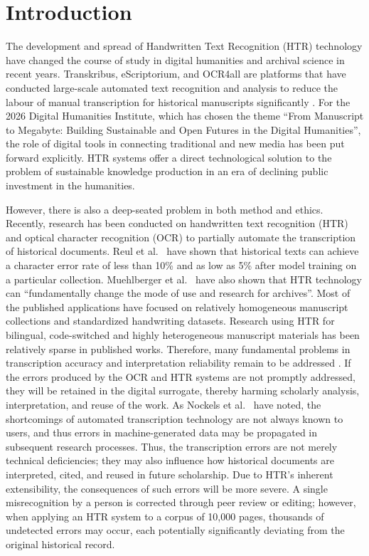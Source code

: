 \documentclass[final]{anthology-ch} %
\begin{document}
\begin{abstract}
\end{abstract}

\section{Introduction} \label{sec:intro}

The development and spread of Handwritten Text Recognition (HTR) technology have changed the course of study in digital humanities and archival science in recent years. Transkribus, eScriptorium, and OCR4all are platforms that have conducted large-scale automated text recognition and analysis to reduce the labour of manual transcription for historical manuscripts significantly \cite{muehlberger2019transforming, nockels2022understanding}. For the 2026 Digital Humanities Institute, which has chosen the theme \enquote{From Manuscript to Megabyte: Building Sustainable and Open Futures in the Digital Humanities}, the role of digital tools in connecting traditional and new media has been put forward explicitly. HTR systems offer a direct technological solution to the problem of sustainable knowledge production in an era of declining public investment in the humanities.

However, there is also a deep-seated problem in both method and ethics. Recently, research has been conducted on handwritten text recognition (HTR) and optical character recognition (OCR) to partially automate the transcription of historical documents. Reul et al.\ \cite[p.~4853]{reul2019ocr4all} have shown that historical texts can achieve a character error rate of less than 10\% and as low as 5\% after model training on a particular collection. Muehlberger et al.\ \cite[p.~955]{muehlberger2019transforming} have also shown that HTR technology can \enquote{fundamentally change the mode of use and research for archives}. Most of the published applications have focused on relatively homogeneous manuscript collections and standardized handwriting datasets. Research using HTR for bilingual, code-switched and highly heterogeneous manuscript materials has been relatively sparse in published works. Therefore, many fundamental problems in transcription accuracy and interpretation reliability remain to be addressed \cite{nockels2022understanding}. If the errors produced by the OCR and HTR systems are not promptly addressed, they will be retained in the digital surrogate, thereby harming scholarly analysis, interpretation, and reuse of the work. As Nockels et al.\ \cite{nockels2022understanding} have noted, the shortcomings of automated transcription technology are not always known to users, and thus errors in machine-generated data may be propagated in subsequent research processes. Thus, the transcription errors are not merely technical deficiencies; they may also influence how historical documents are interpreted, cited, and reused in future scholarship. Due to HTR's inherent extensibility, the consequences of such errors will be more severe. A single misrecognition by a person is corrected through peer review or editing; however, when applying an HTR system to a corpus of 10,000 pages, thousands of undetected errors may occur, each potentially significantly deviating from the original historical record.
\end{document}
